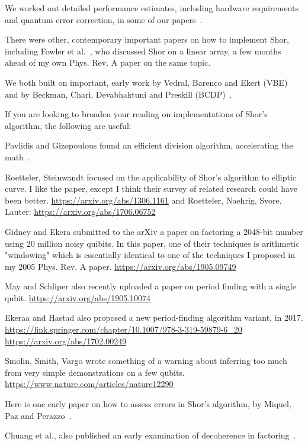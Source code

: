 \documentclass[%
 aip,
 jmp,%
 amsmath,amssymb,
 reprint,%
]{revtex4-1}
\begin{document}
We worked out detailed performance estimates, including hardware
requirements and quantum error correction, in some of our papers~\cite{van-meter10:dist_arch_ijqi,PhysRevX.2.031007}.

There were other, contemporary important papers on how to implement
Shor, including Fowler et al.~\cite{fowler04:_shor_implem},
who discussed Shor on a linear array, a few months ahead of my own
Phys. Rev. A paper on the same topic.

We both built on important, early work by Vedral, Barenco and Ekert
(VBE)~\cite{vedral:quant-arith} and by Beckman, Chari, Devabhaktuni and Preskill (BCDP)~\cite{beckman96:eff-net-quant-fact}.

If you are looking to broaden your reading on implementations of
Shor’s algorithm, the following are useful:

Pavlidis and Gizopoulous found an efficient division algorithm,
accelerating the math~\cite{Pavlidis:2014:FQM:2638682.2638690}.

Roetteler, Steinwandt focused on the applicability of Shor's algorithm
to elliptic curve. I like the paper, except I think their survey of
related research could have been better.
\url{https://arxiv.org/abs/1306.1161}
and Roetteler, Naehrig, Svore, Lauter:
\url{https://arxiv.org/abs/1706.06752}

Gidney and Ekera submitted to the arXiv a paper on factoring a
2048-bit number using 20 million noisy quibits.  In this paper, one of
their techniques is arithmetic "windowing" which is essentially
identical to one of the techniques I proposed in my 2005 Phys. Rev. A
paper.  \url{https://arxiv.org/abs/1905.09749}

May and Schliper also recently uploaded a paper on period finding with
a single qubit.
\url{https://arxiv.org/abs/1905.10074}

Ekeraa and Hastad also proposed a new period-finding algorithm
variant, in 2017.
\url{https://link.springer.com/chapter/10.1007/978-3-319-59879-6_20}
\url{https://arxiv.org/abs/1702.00249}

Smolin, Smith, Vargo wrote something of a warning about inferring too
much from very simple demonstrations on a few qubits.
\url{https://www.nature.com/articles/nature12290}

Here is one early paper on how to assess errors in Shor’s algorithm,
by Miquel, Paz and Perazzo~\cite{miquel1996fdq}.

Chuang et al., also published an early examination of decoherence in
factoring~\cite{chuang95:_factoring-decoherence}.
\end{document}
